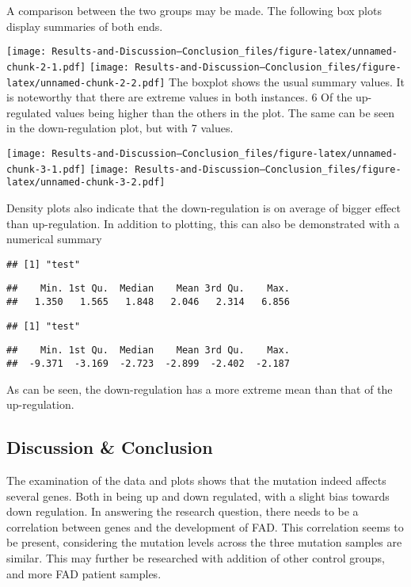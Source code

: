 \documentclass[
]{article}
\begin{document}
A comparison between the two groups may be made. The following box plots
display summaries of both ends.

\texttt{[image: Results-and-Discussion---Conclusion\_files/figure-latex/unnamed-chunk-2-1.pdf]}
\texttt{[image: Results-and-Discussion---Conclusion\_files/figure-latex/unnamed-chunk-2-2.pdf]}
The boxplot shows the usual summary values. It is noteworthy that there
are extreme values in both instances. 6 Of the up-regulated values being
higher than the others in the plot. The same can be seen in the
down-regulation plot, but with 7 values.

\texttt{[image: Results-and-Discussion---Conclusion\_files/figure-latex/unnamed-chunk-3-1.pdf]}
\texttt{[image: Results-and-Discussion---Conclusion\_files/figure-latex/unnamed-chunk-3-2.pdf]}

Density plots also indicate that the down-regulation is on average of
bigger effect than up-regulation. In addition to plotting, this can also
be demonstrated with a numerical summary

\begin{verbatim}
## [1] "test"
\end{verbatim}

\begin{verbatim}
##    Min. 1st Qu.  Median    Mean 3rd Qu.    Max. 
##   1.350   1.565   1.848   2.046   2.314   6.856
\end{verbatim}

\begin{verbatim}
## [1] "test"
\end{verbatim}

\begin{verbatim}
##    Min. 1st Qu.  Median    Mean 3rd Qu.    Max. 
##  -9.371  -3.169  -2.723  -2.899  -2.402  -2.187
\end{verbatim}

As can be seen, the down-regulation has a more extreme mean than that of
the up-regulation.

\hypertarget{discussion-conclusion}{%
\subsection{Discussion \& Conclusion}\label{discussion-conclusion}}

The examination of the data and plots shows that the mutation indeed
affects several genes. Both in being up and down regulated, with a
slight bias towards down regulation. In answering the research question,
there needs to be a correlation between genes and the development of
FAD. This correlation seems to be present, considering the mutation
levels across the three mutation samples are similar. This may further
be researched with addition of other control groups, and more FAD
patient samples.
\end{document}

